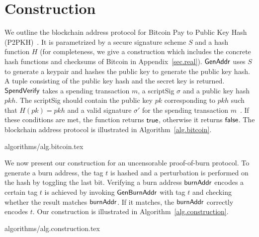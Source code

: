 \section{Construction}\label{section:construction}

We outline the blockchain address protocol for Bitcoin Pay to Public Key Hash (P2PKH)~\cite{bitcoin-dev-guide}. It is parametrized by a secure signature scheme $S$ and a hash function $H$ (for completeness, we give a construction which includes the concrete hash
functions and checksums of Bitcoin in Appendix~\ref{sec.real}).
$\mathsf{GenAddr}$ uses $S$ to generate a keypair and hashes the public key to generate the public key hash. A tuple consisting of the public key hash and the secret key is returned.
$\mathsf{SpendVerify}$ takes a spending transaction $m$, a scriptSig $\sigma$ and a public key hash $pkh$. The scriptSig should contain the public key $pk$ corresponding to $pkh$ such that $H(pk) = pkh$ and a valid signature $\sigma'$ for the spending transaction $m$~\cite{bitcoin-dev-guide}. If these conditions are met, the function returns $\mathsf{true}$, otherwise it returns $\mathsf{false}$.
The blockchain address protocol is illustrated in Algorithm~\ref{alg.bitcoin}.

{algorithms/alg.bitcoin.tex}

We now present our construction for an uncensorable proof-of-burn protocol. To generate a burn address, the tag $t$ is hashed and a perturbation is performed on the hash by toggling the last bit.
Verifying a burn address $\mathsf{burnAddr}$ encodes a certain tag $t$ is achieved by invoking $\mathsf{Gen}\-\mathsf{Burn}\-\mathsf{Addr}$ with tag $t$ and checking whether the result matches $\mathsf{burnAddr}$. If it matches, the $\mathsf{burnAddr}$ correctly encodes $t$. Our construction is illustrated in Algorithm~\ref{alg.construction}.

{algorithms/alg.construction.tex}

